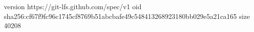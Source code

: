 version https://git-lfs.github.com/spec/v1
oid sha256:cf67f9fc96c1745cf8769b51abcbafe49c548413268923180bb029e5a21ca165
size 40208
